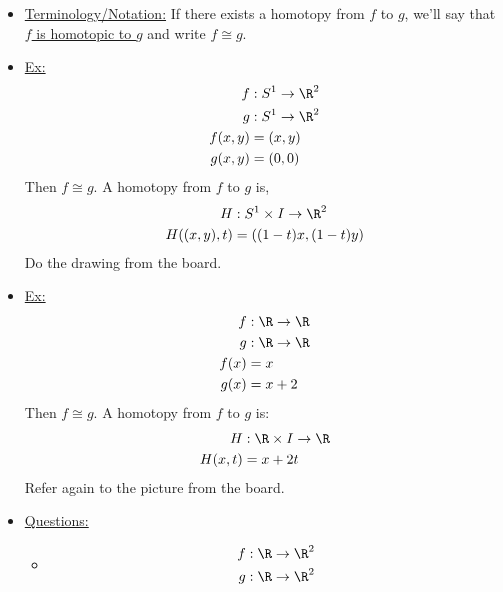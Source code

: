     \begin{itemize}
        \item \underline{Terminology/Notation:} If there exists a homotopy from
            $f$ to $g$, we'll say that \underline{$f$ is homotopic to $g$} and write
            $f\cong g$.\\
        \item \underline{Ex:}
            \begin{align*}
                f&: S^{1}\rightarrow \R^2\\
                g&: S^{1}\rightarrow \R^2\\
                f(x,y)&=(x,y)\\
                g(x,y)&=(0,0)\\
            \end{align*}
            Then $f\cong g$. A homotopy from $f$ to $g$ is,
            \begin{align*}
                H&: S^{1}\times I \rightarrow \R^2\\
                H((x,y),t)&=((1-t)x,(1-t)y)\\
            \end{align*}
            Do the drawing from the board.
        \item \underline{Ex:}
            \begin{align*}
                f&:\R \rightarrow \R\\
                g&:\R \rightarrow \R\\
                f(x)&=x\\
                g(x)&=x+2\\
            \end{align*}
            Then $f\cong g$. A homotopy from $f$ to $g$ is:
            \begin{align*}
                H&:\R \times I \rightarrow \R\\
                H(x,t)&=x+2t\\
            \end{align*}
            Refer again to the picture from the board.
            \newpage
        \item \underline{Questions:}
            \begin{itemize}
                \item
                    \begin{align*}
                        f&: \R \rightarrow \R^2\\
                        g&: \R \rightarrow \R^2\\

\end{align*}
\end{itemize}
\end{itemize}

